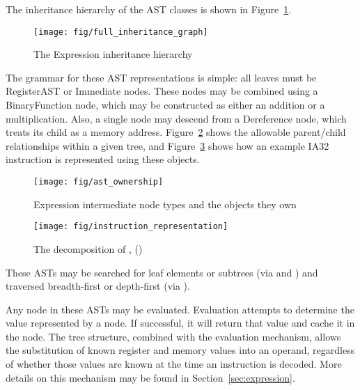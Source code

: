 The inheritance hierarchy of the AST classes is shown in
Figure~\ref{fig:inheritance}. 
\begin{figure}
    \centering
\texttt{[image: fig/full\_inheritance\_graph]}
\caption{The Expression inheritance hierarchy}
\label{fig:inheritance}
\end{figure}

The grammar for these AST representations is simple: all leaves must be
RegisterAST or Immediate nodes. These nodes may be combined using a
BinaryFunction node, which may be constructed as either an addition or a
multiplication. Also, a single node may descend from a Dereference node, which
treats its child as a memory address. Figure~\ref{fig:ownership} shows the allowable parent/child
relationships within a given tree, and Figure~\ref{fig:representation} shows how an example IA32
instruction is represented using these objects. 

\begin{figure}
    \centering
\texttt{[image: fig/ast\_ownership]}
\caption{Expression intermediate node types and the objects they own}
\label{fig:ownership}
\end{figure}
 
\begin{figure}
    \centering
\texttt{[image: fig/instruction\_representation]}
\caption{The decomposition of  , ()}
\label{fig:representation}
\end{figure}

These ASTs may be searched for leaf elements or subtrees (via 
 and ) and traversed breadth-\/first or depth-\/first
(via ).

Any node in these ASTs may be evaluated. Evaluation attempts to determine the
value represented by a node. If successful, it will return that value and cache
it in the node. The tree structure, combined with the evaluation mechanism,
allows the substitution of known register and memory values into an operand,
regardless of whether those values are known at the time an instruction is
decoded. More details on this mechanism may be found in
Section~\ref{sec:expression}.
